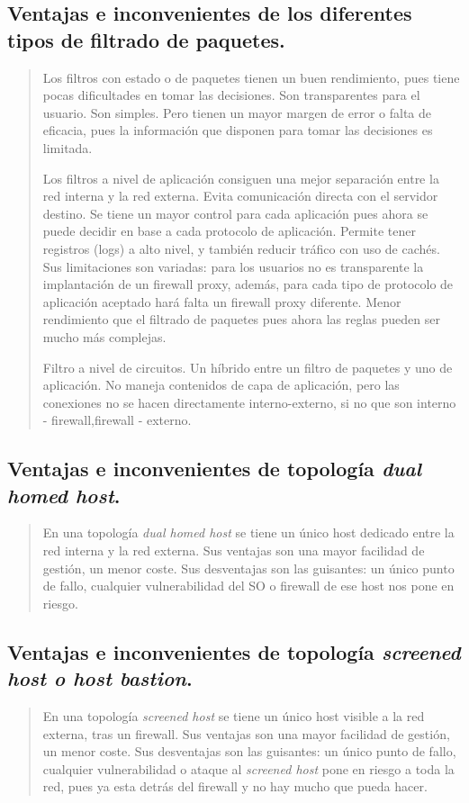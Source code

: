 \documentclass[11pt]{article}
\begin{document}
\subsection{Ventajas e inconvenientes de los diferentes tipos de filtrado de paquetes.}
\label{sec:orgf4e26bc}
\begin{quote}
Los filtros con estado o de paquetes tienen un buen rendimiento, pues tiene pocas dificultades en tomar las decisiones. Son transparentes para el usuario. Son simples. Pero tienen un mayor margen de error o falta de eficacia, pues la información que disponen para tomar las decisiones es limitada.

Los filtros a nivel de aplicación consiguen una mejor separación entre la red interna y la red externa. Evita comunicación directa con el servidor destino. Se tiene un mayor control para cada aplicación pues ahora se puede decidir en base a cada protocolo de aplicación. Permite tener registros (logs) a alto nivel, y también reducir tráfico con uso de cachés. Sus limitaciones son variadas: para los usuarios no es transparente la implantación de un firewall proxy, además, para cada tipo de protocolo de aplicación aceptado hará falta un firewall proxy diferente. Menor rendimiento que el filtrado de paquetes pues ahora las reglas pueden ser mucho más complejas.

Filtro a nivel de circuitos. Un híbrido entre un filtro de paquetes y uno de aplicación. No maneja contenidos de capa de aplicación, pero las conexiones no se hacen directamente interno-externo, si no que son interno - firewall,firewall - externo.
\end{quote}
\subsection{Ventajas e inconvenientes de topología \emph{dual homed host}.}
\label{sec:org7295f69}
\begin{quote}
En una topología \emph{dual homed host} se tiene un único host dedicado entre la red interna y la red externa. Sus ventajas son una mayor facilidad de gestión, un menor coste. Sus desventajas son las guisantes: un único punto de fallo, cualquier vulnerabilidad del SO o firewall de ese host nos pone en riesgo.
\end{quote}
\subsection{Ventajas e inconvenientes de topología \emph{screened host o host bastion}.}
\label{sec:org2c52965}
\begin{quote}
En una topología \emph{screened host} se tiene un único host visible a la red externa, tras un firewall. Sus ventajas son una mayor facilidad de gestión, un menor coste. Sus desventajas son las guisantes: un único punto de fallo, cualquier vulnerabilidad o ataque al \emph{screened host} pone en riesgo a toda la red, pues ya esta detrás del firewall y no hay mucho que pueda hacer.
\end{quote}
\end{document}
